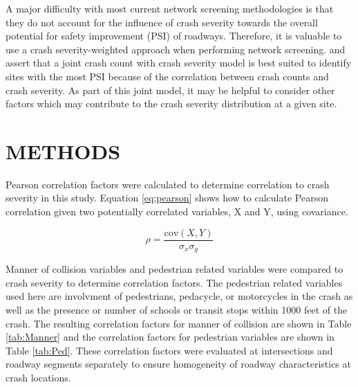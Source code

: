\documentclass[3p, authoryear]{elsarticle} %
\begin{document}
A major difficulty with most current network screening methodologies is that they do not account for the influence of crash severity towards the overall potential for safety improvement (PSI) of roadways. Therefore, it is valuable to use a crash severity-weighted approach when performing network screening. \citet{yasmin2018} and \citet{afghari2020} assert that a joint crash count with crash severity model is best suited to identify sites with the most PSI because of the correlation between crash counts and crash severity. As part of this joint model, it may be helpful to consider other factors which may contribute to the crash severity distribution at a given site.

\hypertarget{methods}{%
\section{METHODS}\label{methods}}

Pearson correlation factors were calculated to determine correlation to crash severity in this study. Equation \eqref{eq:pearson} shows how to calculate Pearson correlation given two potentially correlated variables, X and Y, using covariance.

\begin{equation}
  \rho = \frac{\text{cov}(X,Y)}{\sigma_x \sigma_y}
  \label{eq:pearson}
\end{equation}

Manner of collision variables and pedestrian related variables were compared to crash severity to determine correlation factors. The pedestrian related variables used here are involvment of pedestrians, pedacycle, or motorcycles in the crash as well as the presence or number of schools or transit stops within 1000 feet of the crash. The resulting correlation factors for manner of collision are shown in Table \ref{tab:Manner} and the correlation factors for pedestrian variables are shown in Table \ref{tab:Ped}. These correlation factors were evaluated at intersections and roadway segments separately to ensure homogeneity of roadway characteristics at crash locations.
\end{document}
